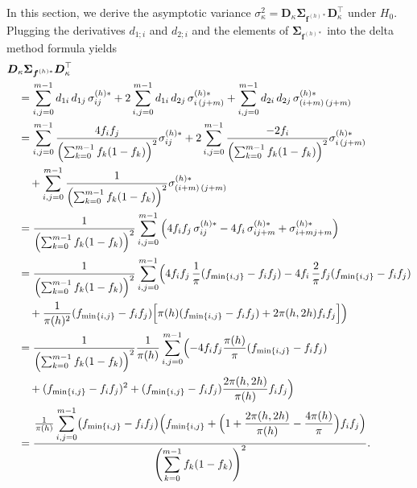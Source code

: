﻿\documentclass[12pt,a4paper]{scrreprt}
\theoremstyle{definition}
\begin{document}
\begin{appendices}
In this section, we derive the asymptotic variance $\sigma^2_\kappa = 
\boldsymbol{D}_\kappa \boldsymbol{\Sigma}_{\boldsymbol{f}^{(h)*}} 
\boldsymbol{D}_\kappa^\top$ under $H_0$. Plugging the derivatives 
$d_{1;i}$ and $d_{2;i}$ and the elements of 
$\boldsymbol{\Sigma}_{\boldsymbol{f}^{(h)*}}$ into the delta method 
formula yields
{\allowdisplaybreaks\begin{align*}
    &\boldsymbol{D}_{\kappa}\boldsymbol{\Sigma}_{\boldsymbol{f}^{(h)*}}
    \boldsymbol{D}_{\kappa}^\top \\
    &\quad = \sum_{i,j=0}^{m-1} d_{1i}\,d_{1j}\,\sigma^{(h)*}_{ij}
    + 2\sum_{i,j=0}^{m-1} d_{1i}\,d_{2j}\,\sigma^{(h)*}_{i\,(j+m)}
    + \sum_{i,j=0}^{m-1} d_{2i}\,d_{2j}\,\sigma^{(h)*}_{(i+m)\,(j+m)} \\
    &\quad = \sum_{i,j=0}^{m-1} 
        \frac{4f_if_j}{\left(\sum_{k=0}^{m-1}f_k(1-f_k)\right)^2}
        \sigma^{(h)*}_{ij}
    + 2\sum_{i,j=0}^{m-1} 
        \frac{-2f_i}{\left(\sum_{k=0}^{m-1}f_k(1-f_k)\right)^2}
        \sigma^{(h)*}_{i\,(j+m)} \\
    &\qquad + \sum_{i,j=0}^{m-1} 
        \frac{1}{\left(\sum_{k=0}^{m-1}f_k(1-f_k)\right)^2}
        \sigma^{(h)*}_{(i+m)\,(j+m)} \\
    &\quad = \frac{1}{\left(\sum_{k=0}^{m-1}f_k(1-f_k)\right)^2} 
        \sum_{i,j=0}^{m-1}\left(
        4f_if_j\,\sigma^{(h)*}_{ij} 
        - 4f_i\,\sigma^{(h)*}_{ij+m} 
        + \sigma^{(h)*}_{i+mj+m}\right) \\
    &\quad = \frac{1}{\left(\sum_{k=0}^{m-1}f_k(1-f_k)\right)^2} 
        \sum_{i,j=0}^{m-1}\Bigl(
        4f_if_j\,\frac{1}{\pi}(f_{\min\{i,j\}}-f_if_j) 
        - 4f_i\,\frac{2}{\pi}f_j(f_{\min\{i,j\}}-f_if_j) \\
    &\qquad + \frac{1}{\pi(h)^2}(f_{\min\{i,j\}}-f_if_j)
        \Bigl[\pi(h)(f_{\min\{i,j\}}-f_if_j) 
        + 2\pi(h,2h)f_if_j\Bigr]\Bigr) \\
    &\quad = \frac{1}{\left(\sum_{k=0}^{m-1}f_k(1-f_k)\right)^2}
        \frac{1}{\pi(h)}\sum_{i,j=0}^{m-1}\Bigl(
        -4f_if_j\frac{\pi(h)}{\pi}(f_{\min\{i,j\}}-f_if_j) \\
    &\qquad + (f_{\min\{i,j\}}-f_if_j)^2 
        + (f_{\min\{i,j\}}-f_if_j)\frac{2\pi(h,2h)}{\pi(h)}f_if_j\Bigr) \\
    &\quad = \frac{\frac{1}{\pi(h)}\displaystyle\sum_{i,j=0}^{m-1}
        \bigl(f_{\min\{i,j\}}-f_if_j\bigr)
        \Bigl(f_{\min\{i,j\}} 
        + \Bigl(1 + \frac{2\pi(h,2h)}{\pi(h)} 
        - \frac{4\pi(h)}{\pi}\Bigr)f_if_j\Bigr)}
        {\left(\displaystyle\sum_{k=0}^{m-1}f_k(1-f_k)\right)^2}.
\end{align*}}


\end{appendices}
\end{document}
